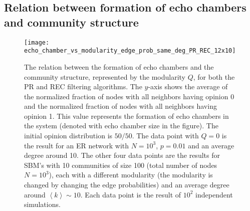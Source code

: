 \documentclass[11 pt , letterpaper , twoside , openright]{book}
\begin{document}
\subsection{Relation between formation of echo chambers and community structure}\label{echoVSmod}

\begin{figure}[H]
	\texttt{[image: echo\_chamber\_vs\_modularity\_edge\_prob\_same\_deg\_PR\_REC\_12x10]}
	\captionsetup{format=plain}
	\caption[Relation between the formation of echo chambers and community structure (modularity)]{The relation between the formation of echo chambers and the community structure, represented by the modularity $Q$, for both the PR and REC filtering algorithms. The $y$-axis shows the average of the normalized fraction of nodes with all neighbors having opinion 0 and the normalized fraction of nodes with all neighbors having opinion 1. This value represents the formation of echo chambers in the system (denoted with echo chamber size in the figure). The initial opinion distribution is $50/50$. The data point with $Q = 0$ is the result for an ER network with $N = 10^3$, $p = 0.01$ and an average degree around 10. The other four data points are the results for SBM's with 10 communities of size 100 (total number of nodes $N = 10^3$), each with a different modularity (the modularity is changed by changing the edge probabilities) and an average degree around $\left<k\right> \sim 10$. Each data point is the result of $10^2$ independent simulations.}
\label{echo_vs_mod}
\end{figure}
\end{document}
